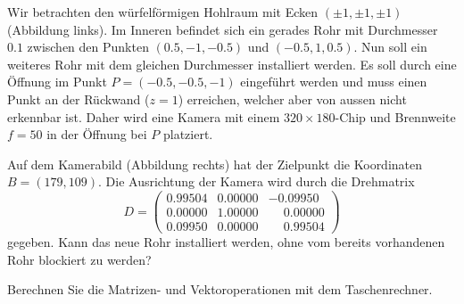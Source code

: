 Wir betrachten den würfelförmigen Hohlraum mit Ecken $(\pm1,\pm1,\pm1)$
(Abbildung links).
Im Inneren befindet sich ein gerades Rohr mit Durchmesser $0.1$ zwischen
den Punkten $(0.5,-1,-0.5)$ und $(-0.5,1,0.5)$.
Nun soll ein weiteres Rohr mit dem gleichen Durchmesser installiert werden.
Es soll durch eine Öffnung im Punkt $P=(-0.5,-0.5,-1)$ eingeführt werden und 
muss einen Punkt an der Rückwand ($z=1$) erreichen, welcher aber von aussen nicht
erkennbar ist.
Daher wird eine Kamera mit einem $320\times 180$-Chip und Brennweite $f=50$
in der Öffnung bei $P$ platziert.
\begin{center}
\end{center}
Auf dem Kamerabild (Abbildung rechts) hat der Zielpunkt die Koordinaten
$B=(179,109)$.
Die Ausrichtung der Kamera wird durch die Drehmatrix
\[
D
=
\begin{pmatrix}
   0.99504 & 0.00000 &         - 0.09950\\
   0.00000 & 1.00000 &\phantom{-}0.00000\\
   0.09950 & 0.00000 &\phantom{-}0.99504
\end{pmatrix}
\]
gegeben.
Kann das neue Rohr installiert werden, ohne vom bereits vorhandenen
Rohr blockiert zu werden?

\begin{hinweis}
Berechnen Sie die Matrizen- und Vektoroperationen mit dem Taschenrechner.
\end{hinweis}

